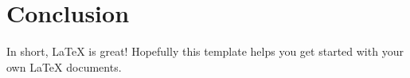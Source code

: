 %

\section{Conclusion}

In short, LaTeX is great! Hopefully this template helps you get started with
your own LaTeX documents.
